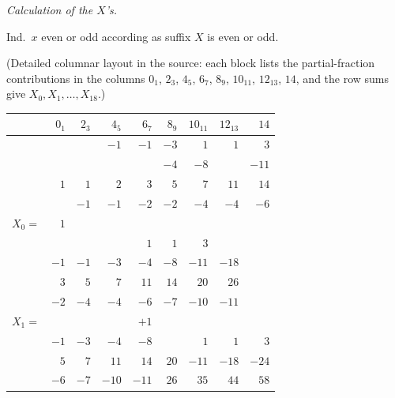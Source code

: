 \documentclass[11pt]{article}
\begin{document}
\begin{center}\textit{Calculation of the $X$'s.}\end{center}

\noindent Ind.~$x$ even or odd according as suffix $X$ is even or odd.

\smallskip
{\small (Detailed columnar layout in the source: each block lists the partial-fraction contributions in the columns $0_{1}$, $2_{3}$, $4_{5}$, $6_{7}$, $8_{9}$, $10_{11}$, $12_{13}$, $14$, and the row sums give $X_{0}, X_{1}, \dots, X_{18}$.)}

\begin{center}\small
\begin{tabular}{l|rrrrrrrr}
            & $0_{1}$ & $2_{3}$ & $4_{5}$ & $6_{7}$ & $8_{9}$ & $10_{11}$ & $12_{13}$ & $14$ \\\hline
            &         &         & $-1$    & $-1$    & $-3$    & $1$       & $1$       & $3$  \\
            &         &         &         &         & $-4$    & $-8$      &           & $-11$\\
            & $1$     & $1$     & $2$     & $3$     & $5$     & $7$       & $11$      & $14$ \\
            &         & $-1$    & $-1$    & $-2$    & $-2$    & $-4$      & $-4$      & $-6$ \\
$X_{0}=$    & $1$     &         &         &         &         &           &           &      \\\hline
            &         &         &         & $1$     & $1$     & $3$       &           &      \\
            & $-1$    & $-1$    & $-3$    & $-4$    & $-8$    & $-11$     & $-18$     &      \\
            & $3$     & $5$     & $7$     & $11$    & $14$    & $20$      & $26$      &      \\
            & $-2$    & $-4$    & $-4$    & $-6$    & $-7$    & $-10$     & $-11$     &      \\
$X_{1}=$    &         &         &         & $+1$    &         &           &           &      \\\hline
            & $-1$    & $-3$    & $-4$    & $-8$    &         & $1$       & $1$       & $3$  \\
            & $5$     & $7$     & $11$    & $14$    & $20$    & $-11$     & $-18$     & $-24$\\
            & $-6$    & $-7$    & $-10$   & $-11$   & $26$    & $35$      & $44$      & $58$ \\

\end{tabular}
\end{center}
\end{document}
